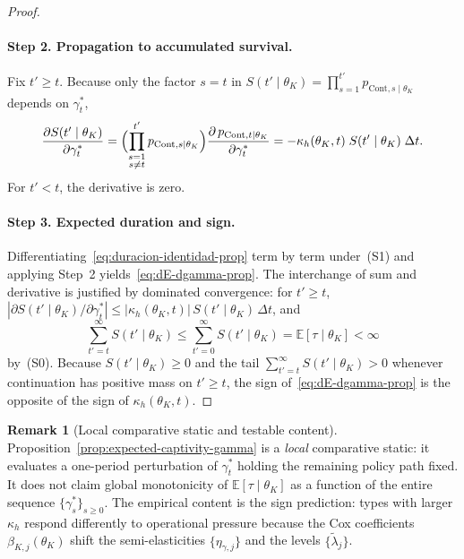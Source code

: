 \documentclass[12pt]{article}
\numberwithin{equation}{section}
\numberwithin{table}{section}
\theoremstyle{definition}
\newtheorem{remark}[theorem]{Remark}
\begin{document}
\begin{proof}
\paragraph{Step 2. Propagation to accumulated survival.}
Fix $t'\ge t$. Because only the factor $s=t$ in
$S(t'\mid\theta_K)=\prod_{s=1}^{t'}p_{\mathrm{Cont},s\mid\theta_K}$ depends on
$\gamma_t^\ast$,
\[
\frac{\partial S(t'\mid\theta_K)}{\partial\gamma_t^\ast}
=\Bigl(\prod_{\substack{s=1\\s\neq t}}^{t'}p_{\mathrm{Cont},s\mid\theta_K}\Bigr)
\frac{\partial\,p_{\mathrm{Cont},t\mid\theta_K}}{\partial\gamma_t^\ast}
=-\kappa_h(\theta_K,t)\;S(t'\mid\theta_K)\;\Delta t.
\]
For $t'<t$, the derivative is zero.

\paragraph{Step 3. Expected duration and sign.}
Differentiating~\eqref{eq:duracion-identidad-prop} term by term under~\textup{(S1)}
and applying Step~2 yields~\eqref{eq:dE-dgamma-prop}. The interchange of sum and
derivative is justified by dominated convergence: for $t'\ge t$,
$|\partial S(t'\mid\theta_K)/\partial\gamma_t^\ast|
\le|\kappa_h(\theta_K,t)|\,S(t'\mid\theta_K)\,\Delta t$, and
\[
\sum_{t'=t}^{\infty}S(t'\mid\theta_K)
\le\sum_{t'=0}^{\infty}S(t'\mid\theta_K)
=\mathbb{E}[\tau\mid\theta_K]<\infty
\]
by~\textup{(S0)}. Because $S(t'\mid\theta_K)\ge 0$ and the tail
$\sum_{t'=t}^{\infty}S(t'\mid\theta_K)>0$ whenever continuation has positive
mass on $t'\ge t$, the sign of~\eqref{eq:dE-dgamma-prop} is the opposite of the
sign of $\kappa_h(\theta_K,t)$.
\end{proof}

\begin{remark}[Local comparative static and testable content]
\label{rem:captivity-local-cs}
Proposition~\ref{prop:expected-captivity-gamma} is a \emph{local} comparative
static: it evaluates a one-period perturbation of $\gamma_t^\ast$ holding the
remaining policy path fixed. It does not claim global monotonicity of
$\mathbb{E}[\tau\mid\theta_K]$ as a function of the entire sequence
$\{\gamma_s^\ast\}_{s\ge 0}$. The empirical content is the sign prediction:
types with larger $\kappa_h$ respond differently to operational pressure because
the Cox coefficients $\beta_{K,j}(\theta_K)$ shift the semi-elasticities
$\{\eta_{\gamma,j}\}$ and the levels $\{\tilde\lambda_j\}$.
\end{remark}

\end{document}
